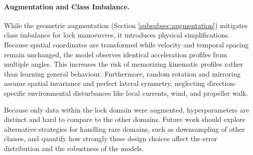 \paragraph{Augmentation and Class Imbalance.}

While the geometric augmentation (Section \ref{subsubsec:augmentation}) mitigates class imbalance for lock manoeuvres, it introduces physical simplifications. Because spatial coordinates are transformed while velocity and temporal spacing remain unchanged, the model observes identical acceleration profiles from multiple angles. This increases the risk of memorizing kinematic profiles rather than learning general behaviour. Furthermore, random rotation and mirroring assume spatial invariance and perfect lateral symmetry, neglecting direction-specific environmental disturbances like local currents, wind, and propeller walk.

Because only data within the lock domain were augmented, hyperparameters are distinct and hard to compare to the other domains. Future work should explore alternative strategies for handling rare domains, such as downsampling of other classes, and quantify how strongly these design choices affect the error distribution and the robustness of the models.

